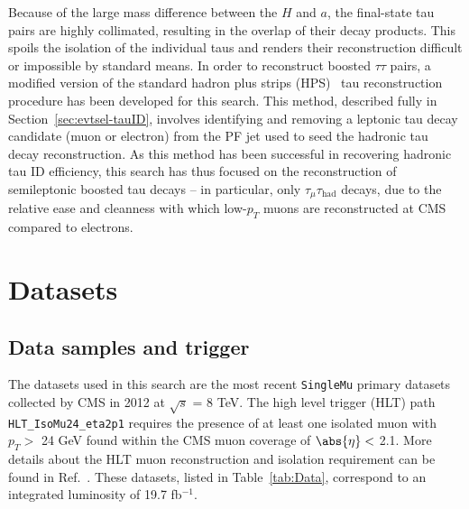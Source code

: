 Because of the large mass difference between the $H$ and $a$, the final-state tau pairs are highly collimated, resulting in the overlap of their decay products. This spoils the isolation of the individual taus and renders their reconstruction difficult or impossible by standard means. In order to reconstruct boosted $\tau\tau$ pairs, a modified version of the standard hadron plus strips (HPS)~\cite{CMS:2011msa} tau reconstruction procedure has been developed for this search. This method, described fully in Section~\ref{sec:evtsel-tauID}, involves identifying and removing a leptonic tau decay candidate (muon or electron) from the PF jet used to seed the hadronic tau decay reconstruction. As this method has been successful in recovering hadronic tau ID efficiency, this search has thus focused on the reconstruction of semileptonic boosted tau decays -- in particular, only $\tau_{\mu}\tau_{\text{had}}$ decays, due to the relative ease and cleanness with which low-$p_T$ muons are reconstructed at CMS compared to electrons.

\section{Datasets\label{sec:datasets}}

\subsection{Data samples and trigger\label{sec:datasets-data}}
The datasets used in this search are the most recent \texttt{SingleMu} primary datasets collected by CMS in 2012 at $\sqrt{s}$ = 8 TeV.  The high level trigger (HLT) path \texttt{HLT\_IsoMu24\_eta2p1} requires the presence of at least one isolated muon with $p_T >$ 24 GeV found within the CMS muon coverage of $\abs{\eta} <$ 2.1.  More details about the HLT muon reconstruction and isolation requirement can be found in Ref.~\cite{HLTMenus}.  These datasets, listed in Table~\ref{tab:Data}, correspond to an integrated luminosity of 19.7 fb$^{-1}$.%

